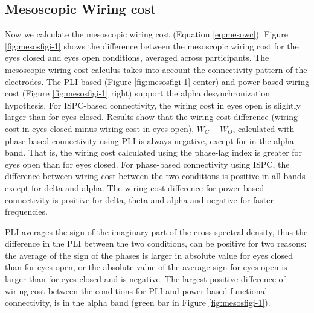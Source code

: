 \documentclass[11pt, onecolumn]{article}
\begin{document}
{%

\subsection{Mesoscopic Wiring cost} %
Now we calculate the mesoscopic wiring cost (Equation \ref{eq:mesowc}). Figure \ref{fig:mesosfigi-1} shows the difference between the mesoscopic wiring cost for the eyes closed and eyes open conditions, averaged across  participants.
The mesoscopic wiring cost calculus takes into account the connectivity pattern of the electrodes. The PLI-based (Figure \ref{fig:mesosfigi-1} center) and power-based wiring cost (Figure \ref{fig:mesosfigi-1} right) support the alpha desynchronization hypothesis. For ISPC-based connectivity, the wiring cost in eyes open is slightly larger than for eyes closed.
Results show that the wiring cost difference (wiring cost in eyes closed  minus wiring cost in eyes open), $W_C - W_O$, calculated with phase-based connectivity using PLI is always negative, except for in the alpha band. That is, the wiring cost calculated using the phase-lag index is greater  for eyes open than for eyes closed. 
For phase-based connectivity using ISPC, the difference between wiring cost between the two conditions is positive in all bands except for delta and alpha. The wiring cost difference for power-based connectivity is positive for delta, theta and alpha and negative for faster frequencies. 

PLI averages the sign of the imaginary part of the cross spectral density, thus the difference in the PLI between the two conditions, can be positive for two reasons: the average of the sign of the phases is larger in absolute value for eyes closed than for eyes open, or the absolute value of the average sign for eyes open is larger than for eyes closed and is negative.
The largest positive difference of wiring cost between the conditions for PLI and power-based functional connectivity, is in the alpha band (green bar in Figure \ref{fig:mesosfigi-1}).

}
\end{document}
